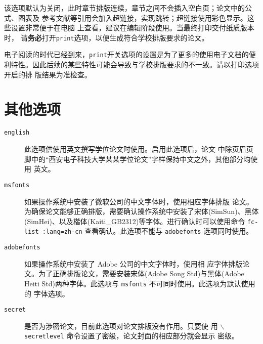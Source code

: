 该选项默认为关闭，此时章节排版连续，章节之间不会插入空白页；论文中的公式、图表及
参考文献等引用会加入超链接，实现跳转；超链接使用彩色显示。这些设置非常便于在电脑
上查看，建议在编辑阶段使用。当最终打印交付纸质版本时，
请\textbf{务必}打开\texttt{print}选项，以便生成符合学校排版要求的论文。

电子阅读的时代已经到来，\texttt{print}开关选项的设置是为了更多的使用电子文档的便
利特性。因此后续的某些特性可能会导致与学校排版要求的不一致。请以打印选项开启的排
版结果为准检查。


\section{其他选项}
\label{sec:others}


\begin{description}
\item [\texttt{english}] 此选项供使用英文撰写学位论文时使用。启用此选项后，论文
  中除页眉页脚中的“西安电子科技大学某某学位论文”字样保持中文之外，其他部分均使用
  英文。
\item [\texttt{msfonts}] 如果操作系统中安装了微软公司的中文字体时，使用相应字体排版
  论文。为确保论文能够正确排版，需要确认操作系统中安装了宋体(SimSun)、黑体
  (SimHei)、以及楷体(Kaiti\_GB2312)等字体。进行确认时可以使用命令 \texttt{fc-list
  :lang=zh-cn} 查看确认。此选项不能与 \texttt{adobefonts} 选项同时使用。
\item [\texttt{adobefonts}] 如果操作系统中安装了 Adobe 公司的中文字体时，使用相
  应字体排版论文。为了正确排版论文，需要安装宋体(Adobe Song Std)与黑体(Adobe
  Heiti Std)两种字体。此选项与 \texttt{msfonts} 不可同时使用。此选项为默认使用的
  字体选项。
\item [\texttt{secret}] 是否为涉密论文，目前此选项对论文排版没有作用。只要使
  用 \texttt{$\backslash$secretlevel} 命令设置了密级，论文封面的相应部分就会显示
  密级。
\end{description}


